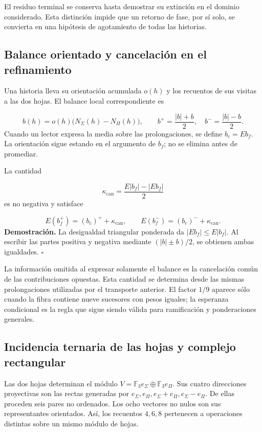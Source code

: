 El residuo terminal se conserva hasta demostrar su extinción en el dominio considerado. Esta distinción impide que un retorno de fase, por sí solo, se convierta en una hipótesis de agotamiento de todas las historias.

\subsection{Balance orientado y cancelación en el refinamiento}
Una historia lleva su orientación acumulada \(o(h)\) y los recuentos de sus visitas a las dos hojas. El balance local correspondiente es

\[
b(h)=o(h)\bigl(N_\Sigma(h)-N_\Pi(h)\bigr),
\qquad
b^+=\frac{|b|+b}{2},\quad b^-=\frac{|b|-b}{2}.
\]
Cuando un lector expresa la media sobre las prolongaciones, se define \(b_c=Eb_f\). La orientación sigue estando en el argumento de \(b_f\); no se elimina antes de promediar.

La cantidad

\[
\kappa_{\mathrm{can}}=
\frac{E|b_f|-|Eb_f|}{2}
\]
es no negativa y satisface

\[
E(b_f^+)=(b_c)^++\kappa_{\mathrm{can}},
\qquad
E(b_f^-)=(b_c)^-+\kappa_{\mathrm{can}}.
\]
\textbf{Demostración.} La desigualdad triangular ponderada da \(|Eb_f|\leq E|b_f|\). Al escribir las partes positiva y negativa mediante \((|b|\pm b)/2\), se obtienen ambas igualdades. \hfill\(\square\)

La información omitida al expresar solamente el balance es la cancelación común de las contribuciones opuestas. Esta cantidad se determina desde las mismas prolongaciones utilizadas por el transporte anterior. El factor \(1/9\) aparece sólo cuando la fibra contiene nueve sucesores con pesos iguales; la esperanza condicional es la regla que sigue siendo válida para ramificación y ponderaciones generales.

\subsection{Incidencia ternaria de las hojas y complejo rectangular}
Las dos hojas determinan el módulo \(V=\mathbb F_3e_\Sigma\oplus\mathbb F_3e_\Pi\). Sus cuatro direcciones proyectivas son las rectas generadas por \(e_\Sigma,e_\Pi,e_\Sigma+e_\Pi,e_\Sigma-e_\Pi\). De ellas proceden seis pares no ordenados. Los ocho vectores no nulos son sus representantes orientados. Así, los recuentos \(4,6,8\) pertenecen a operaciones distintas sobre un mismo módulo de hojas.

